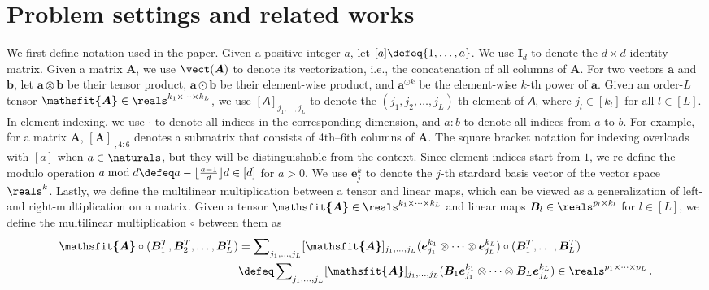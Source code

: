 \documentclass{article} %
\def\va{{\bm{a}}}
\def\vb{{\bm{b}}}
\def\ve{{\bm{e}}}
\def\mA{{\bm{A}}}
\def\mB{{\bm{B}}}
\def\mI{{\bm{I}}}
\newcommand{\tens}[1]{\bm{\mathsfit{#1}}}
\def\tA{{\tens{A}}}
\begin{document}
\section{Problem settings and related works}
We first define notation used in the paper.
Given a positive integer $a$, let $[a]\defeq \{1, \dots, a\}$.
We use $\mI_d$ to denote the $d \times d$ identity matrix.
Given a matrix $\mA$, we use $\vect(\mA)$ to denote its vectorization, i.e., the concatenation of all columns of $\mA$.
For two vectors $\va$ and $\vb$, let $\va \otimes \vb$ be their tensor product, $\va \odot \vb$ be their element-wise product, and $\va^{\odot k}$ be the element-wise $k$-th power of $\va$.
Given an order-$L$ tensor $\tA \in \reals^{k_1 \times \cdots \times k_L}$, we use $[\tA]_{j_1, \dots, j_L}$ to denote the $(j_1, j_2, \dots, j_L)$-th element of $\tA$, where $j_l \in [k_l]$ for all $l \in [L]$.
In element indexing, we use $\cdot$ to denote all indices in the corresponding dimension, and $a:b$ to denote all indices from $a$ to $b$. For example, for a matrix $\mA$, $[\mA]_{\cdot,4:6}$ denotes a submatrix that consists of 4th--6th columns of $\mA$. 
The square bracket notation for indexing overloads with $[a]$ when $a \in \naturals$, but they will be distinguishable from the context.
Since element indices start from $1$, we re-define the modulo operation $a \bmod d \defeq a - \lfloor \frac{a-1}{d} \rfloor d \in [d]$ for $a > 0$.
We use $\ve^k_j$ to denote the $j$-th stardard basis vector of the vector space $\reals^{k}$.
Lastly, we define the multilinear multiplication between a tensor and linear maps, which can be viewed as a generalization of left- and right-multiplication on a matrix.
Given a tensor $\tA \in \reals^{k_1 \times \cdots \times k_L}$ and linear maps $\mB_l \in \reals^{p_l \times k_l}$ for $l \in [L]$, we define the multilinear multiplication $\circ$ between them as
\begin{align*}
    \tA \circ (\mB_1^T, \mB_2^T, \dots, \mB_L^T)
    &= \sum\nolimits_{j_1, \dots, j_L} [\tA]_{j_1, \dots, j_L} (\ve^{k_1}_{j_1} \otimes \cdots \otimes \ve^{k_L}_{j_L}) \circ (\mB_1^T, \dots, \mB_L^T)\\
    &\defeq \sum\nolimits_{j_1, \dots, j_L} [\tA]_{j_1, \dots, j_L} (\mB_1 \ve^{k_1}_{j_1} \otimes \cdots \otimes \mB_L \ve^{k_L}_{j_L}) 
    \in \reals^{p_1\times \cdots \times p_L}\,.
\end{align*}
\end{document}
